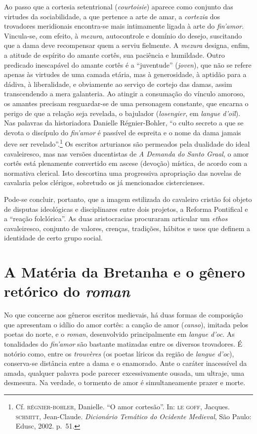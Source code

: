 Ao passo que a cortesia setentrional (\textit{courtoisie}) aparece como
conjunto das virtudes da sociabilidade, a que pertence a arte de amar,
a \textit{cortezia} dos trovadores meridionais encontra-se mais
intimamente ligada à arte do \textit{fin’amor}. Vincula-se, com efeito,
à \textit{mezura}, autocontrole e domínio do desejo, suscitando que a
dama deve recompensar quem a serviu fielmente. A \textit{mezura}
designa, enfim, a atitude de espírito do amante cortês, sua paciência e
humildade. Outro predicado inescapável do amante cortês é a “juventude”
(\textit{joven}), que não se refere apenas às virtudes de uma camada
etária, mas à generosidade, à aptidão para a dádiva, à liberalidade, e
obviamente ao serviço de cortejo das damas, assim transcendendo a mera
galanteria. Ao atingir a consumação do vínculo amoroso, os amantes
precisam resguardar-se de uma personagem constante, que encarna o
perigo de que a relação seja revelada, o bajulador (\textit{losengier},
em \textit{langue d’oïl}). Nas palavras da historiadora Danielle
Régnier-Bohler, “o culto secreto a que se devota o discípulo do
\textit{fin’amor} é passível de espreita e o nome da dama jamais deve
ser revelado”.\footnote{ Cf. \textsc{régnier-bohler}, Danielle. “O amor
cortesão”. In: \textsc{le goff}, Jacques. \textsc{schmitt}, Jean-Claude.
\textit{Dicionário Temático do Ocidente Medieval}, São Paulo: Edusc,
2002. p.~51.} Os escritos arturianos são permeados pela
dualidade do ideal cavaleiresco, mas nas versões ducentistas
de \textit{A Demanda do Santo Graal}, o amor cortês está plenamente
convertido em ascese (devoção) mística, de acordo com a normativa
clerical. Isto descortina uma progressiva apropriação das novelas de
cavalaria pelos clérigos, sobretudo os já mencionados cistercienses. 

Pode-se concluir, portanto, que a imagem estilizada do cavaleiro cristão
foi objeto de disputas ideológicas e disciplinares entre dois projetos,
a Reforma Pontifical e a “reação folclórica”. As duas aristocracias
procuraram articular um \textit{ethos} cavaleiresco, conjunto de
valores, crenças, tradições, hábitos e usos que definem a identidade de
certo grupo social.  

\section{A Matéria da Bretanha e o gênero retórico do \textit{roman}}

No que concerne aos gêneros escritos medievais, há duas formas de
composição que apresentam o idílio do amor cortês: a canção de amor
(\textit{canso}), imitada pelos poetas do norte, e o \textit{roman},
desenvolvido principalmente em \textit{langue d’oc}. As tonalidades do
\textit{fin’amor} são bastante matizadas entre os diversos trovadores.
É notório como, entre os \textit{trouvères} (os poetas líricos da
região de \textit{langue d’oc}), conserva-se distância entre a dama e o
enamorado. Ante o caráter inacessível da amada, qualquer palavra pode
parecer excessivamente ousada, um ultraje, uma desmesura. Na verdade, o
tormento de amor é simultaneamente prazer e morte. 

